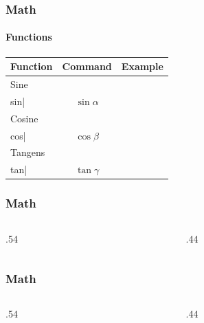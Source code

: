 \begin{frame}
    \frametitle{Math}
    \framesubtitle{Functions}
    \begin{center}
    \begin{tabular}{l c c}
        \textbf{Function}
        & \textbf{Command}
        & \textbf{Example}\\
    \toprule[1.2pt]\pause
        Sine
        & \lstinline|\\sin|
        & $\sin\alpha$\\
    \midrule\pause
        Cosine
        & \lstinline|\\cos|
        & $\cos\beta$\\
    \midrule\pause
        Tangens
        & \lstinline|\\tan|
        & $\tan\gamma$\\
    \end{tabular}
    \end{center}
\end{frame}


\begin{frame}
    \frametitle{Math}
    \begin{columns}
        \begin{column}{.54\textwidth}
        \end{column}
        \begin{column}{.44\textwidth}
            
        \end{column}
    \end{columns}
\end{frame}

\begin{frame}
    \frametitle{Math}
    \begin{columns}
        \begin{column}{.54\textwidth}
        \end{column}
        \begin{column}{.44\textwidth}
            
        \end{column}
    \end{columns}
\end{frame}

